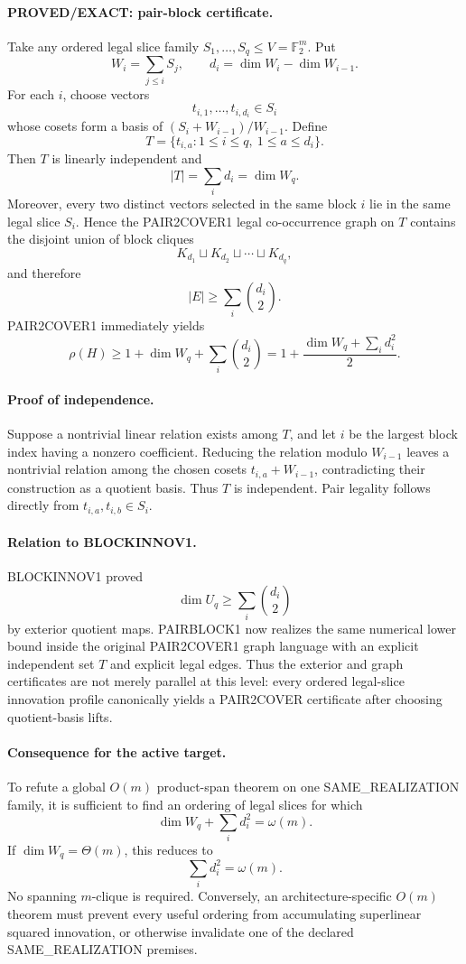 \documentclass[11pt]{article}
\begin{document}
\paragraph{PROVED/EXACT: pair-block certificate.}
Take any ordered legal slice family $S_1,\ldots,S_q\le V=\mathbb F_2^m$. Put
\[
W_i=\sum_{j\le i}S_j,\qquad d_i=\dim W_i-\dim W_{i-1}.
\]
For each $i$, choose vectors
\[
t_{i,1},\ldots,t_{i,d_i}\in S_i
\]
whose cosets form a basis of $(S_i+W_{i-1})/W_{i-1}$. Define
\[
T=\{t_{i,a}:1\le i\le q,\ 1\le a\le d_i\}.
\]
Then $T$ is linearly independent and
\[
\boxed{|T|=\sum_i d_i=\dim W_q.}
\]
Moreover, every two distinct vectors selected in the same block $i$ lie in the same legal slice $S_i$. Hence the PAIR2COVER1 legal co-occurrence graph on $T$ contains the disjoint union of block cliques
\[
K_{d_1}\sqcup K_{d_2}\sqcup\cdots\sqcup K_{d_q},
\]
and therefore
\[
\boxed{|E|\ge\sum_i\binom{d_i}{2}.}
\]
PAIR2COVER1 immediately yields
\[
\boxed{
\rho(H)\ge
1+\dim W_q+\sum_i\binom{d_i}{2}
=
1+\frac{\dim W_q+\sum_i d_i^2}{2}.
}
\]

\paragraph{Proof of independence.}
Suppose a nontrivial linear relation exists among $T$, and let $i$ be the largest block index having a nonzero coefficient. Reducing the relation modulo $W_{i-1}$ leaves a nontrivial relation among the chosen cosets $t_{i,a}+W_{i-1}$, contradicting their construction as a quotient basis. Thus $T$ is independent. Pair legality follows directly from $t_{i,a},t_{i,b}\in S_i$.

\paragraph{Relation to BLOCKINNOV1.}
BLOCKINNOV1 proved
\[
\dim U_q\ge\sum_i\binom{d_i}{2}
\]
by exterior quotient maps. PAIRBLOCK1 now realizes the same numerical lower bound inside the original PAIR2COVER1 graph language with an explicit independent set $T$ and explicit legal edges. Thus the exterior and graph certificates are not merely parallel at this level: every ordered legal-slice innovation profile canonically yields a PAIR2COVER certificate after choosing quotient-basis lifts.

\paragraph{Consequence for the active target.}
To refute a global $O(m)$ product-span theorem on one SAME\_REALIZATION family, it is sufficient to find an ordering of legal slices for which
\[
\dim W_q+\sum_i d_i^2=\omega(m).
\]
If $\dim W_q=\Theta(m)$, this reduces to
\[
\boxed{\sum_i d_i^2=\omega(m).}
\]
No spanning $m$-clique is required. Conversely, an architecture-specific $O(m)$ theorem must prevent every useful ordering from accumulating superlinear squared innovation, or otherwise invalidate one of the declared SAME\_REALIZATION premises.
\end{document}

